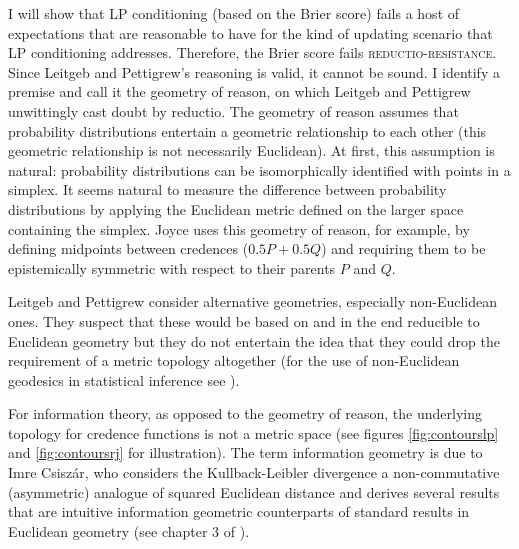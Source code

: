 \documentclass[12pt]{article}
\begin{document}
I will show that LP conditioning (based on the Brier score) fails a
host of expectations that are reasonable to have for the kind of
updating scenario that LP conditioning addresses. Therefore, the Brier
score fails \textsc{reductio-resistance}. Since Leitgeb and
Pettigrew's reasoning is valid, it cannot be sound. I identify a
premise and call it the geometry of reason, on which Leitgeb and
Pettigrew unwittingly cast doubt by reductio. The geometry of reason
assumes that probability distributions entertain a geometric
relationship to each other (this geometric relationship is not
necessarily Euclidean). At first, this assumption is natural:
probability distributions can be isomorphically identified with points
in a simplex. It seems natural to measure the difference between
probability distributions by applying the Euclidean metric defined on
the larger space containing the simplex. Joyce uses this geometry of
reason, for example, by defining midpoints between credences
($0.5P+0.5Q$) and requiring them to be epistemically symmetric with
respect to their parents $P$ and $Q$.

Leitgeb and Pettigrew consider alternative geometries, especially
non-Euclidean ones. They suspect that these would be based on and in
the end reducible to Euclidean geometry but they do not entertain the
idea that they could drop the requirement of a metric topology
altogether (for the use of non-Euclidean geodesics in statistical
inference see ).

For information theory, as opposed to the geometry of reason, the
underlying topology for credence functions is not a metric space (see
figures \ref{fig:contourslp} and \ref{fig:contoursrj} for
illustration). The term information geometry is due to Imre
Csisz{\'a}r, who considers the Kullback-Leibler divergence a
non-commutative (asymmetric) analogue of squared Euclidean distance
and derives several results that are intuitive information geometric
counterparts of standard results in Euclidean geometry (see chapter 3
of ).
\end{document}
